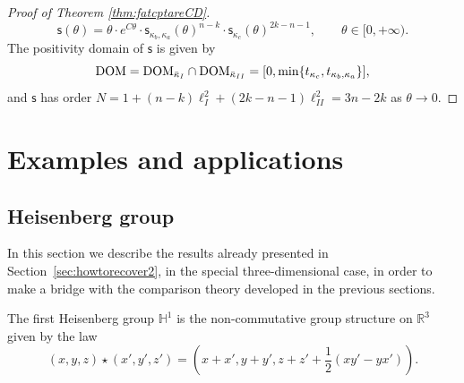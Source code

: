 \documentclass[11pt,a4paper]{article}
\theoremstyle{plain}
\theoremstyle{definition}
\theoremstyle{remark}
\numberwithin{equation}{section}
\newcommand{\R}{\mathbb{R}} %
\newcommand{\DOM}{{\rm{DOM}}}
\newcommand{\sfs}{\mathsf{s}}
\begin{document}
\begin{proof}[Proof of Theorem \ref{thm:fatcptareCD}]
\begin{equation}
\sfs(\theta) = \theta \cdot e^{C\theta} \cdot \sfs_{\kappa_b,\kappa_a}(\theta)^{n-k} \cdot\sfs_{\kappa_c}(\theta)^{2k-n-1}, \qquad \theta \in [0,+\infty).
\end{equation}
The positivity domain of $\sfs$ is given by
\begin{equation}
\DOM=  \DOM_{\bar{\kappa}_I}\cap\DOM_{\bar{\kappa}_{II}} = [0,\min\{t_{\kappa_c},t_{\kappa_b,\kappa_a}\}],
\end{equation}
and $\sfs$ has order $N=1+ (n-k)\ell_I^{2} + (2k-n-1)\ell_{II}^{2} =3n-2k$ as $\theta \to 0$.
\end{proof}
\section{Examples and applications}\label{sec:applications}

\subsection{Heisenberg group}\label{sec:heisenbergpuro}

In this section we describe the results already presented in Section~\ref{sec:howtorecover2}, in the special three-dimensional case, in order to make a bridge with the comparison theory developed in the previous sections.

The first Heisenberg group $\mathbb{H}^1$ is the non-commutative group structure on $\R^{3}$ given by the law
\begin{equation}
(x,y,z) \star (x',y',z') = \left(x+x',y+y', z+z'+\frac{1}{2}(xy'-yx')\right).
\end{equation}
\end{document}
